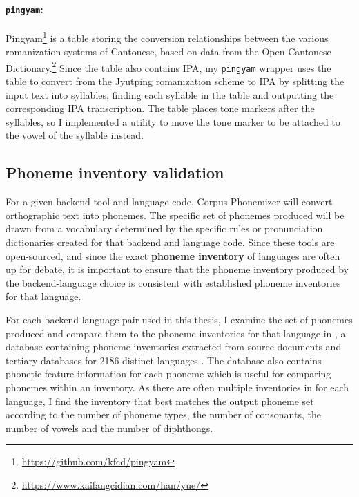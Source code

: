 \paragraph{\texttt{pingyam}:} Pingyam\footnote{\url{https://github.com/kfcd/pingyam}} is a table storing the conversion relationships between the various romanization systems of Cantonese, based on data from the Open Cantonese Dictionary.\footnote{\url{https://www.kaifangcidian.com/han/yue/}} Since the table also contains IPA, my \texttt{pingyam} wrapper uses the table to convert from the Jyutping romanization scheme to IPA by splitting the input text into syllables, finding each syllable in the table and outputting the corresponding IPA transcription. The table places tone markers after the syllables, so I implemented a utility to move the tone marker to be attached to the vowel of the syllable instead.

\subsection{Phoneme inventory validation}
\label{sec:dataset-folding}

For a given backend tool and language code, Corpus Phonemizer will convert orthographic text into phonemes. The specific set of phonemes produced will be drawn from a vocabulary determined by the specific rules or pronunciation dictionaries created for that backend and language code. Since these tools are open-sourced, and since the exact \textbf{phoneme inventory} of languages are often up for debate, it is important to ensure that the phoneme inventory produced by the backend-language choice is consistent with established phoneme inventories for that language.

For each backend-language pair used in this thesis, I examine the set of phonemes produced and compare them to the phoneme inventories for that language in \phoible, a database containing phoneme inventories extracted from source documents and tertiary databases for 2186 distinct languages \citep{phoible}. The database also contains phonetic feature information for each phoneme which is useful for comparing phonemes within an inventory. As there are often multiple inventories in \phoible for each language, I find the inventory that best matches the output phoneme set according to the number of phoneme types, the number of consonants, the number of vowels and the number of diphthongs.


